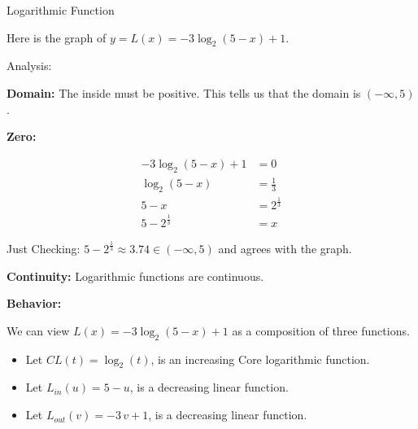 \documentclass{ximera}
\begin{document}
\begin{example} Logarithmic Function



Here is the graph of $y = L(x) = -3 \log_2(5-x)+1$.

\begin{image}
\end{image}




Analysis:

\textbf{Domain:} The inside must be positive. This tells us that the domain is $(-\infty, 5)$.

\textbf{Zero:} 

\begin{align*}
-3 \log_2(5-x)+1 &= 0 \\
\log_2(5-x)      &= \frac{1}{3} \\
5-x              &= 2^{\tfrac{1}{3}} \\
5-2^{\tfrac{1}{3}}    &= x 
\end{align*}

Just Checking:  $5-2^{\tfrac{1}{3}} \approx 3.74 \in (-\infty, 5)$ and agrees with the graph.


\textbf{Continuity:} Logarithmic functions are continuous.

\textbf{Behavior:}

We can view $L(x) = -3 \log_2(5-x)+1$ as a composition of three functions.



\begin{itemize}
\item Let $CL(t) = \log_2(t)$, is an increasing Core logarithmic function.
\item Let $L_{in}(u) = 5 - u$, is a decreasing linear function.
\item Let $L_{out}(v) = -3 \, v + 1$, is a decreasing linear function.
\end{itemize}


\end{example}
\end{document}
